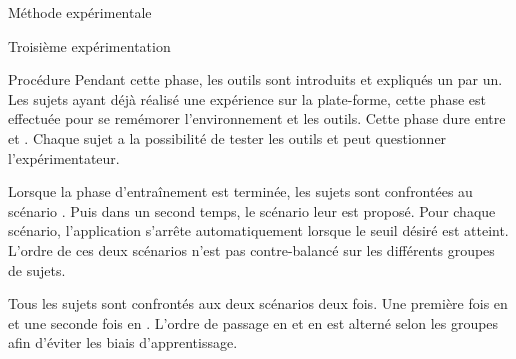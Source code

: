 \documentclass[myfrancais,ngerman,english,frenchb]{mythesis}
\begin{document}
\begin{mychapter}{Méthode expérimentale}
\begin{mysection}{Troisième expérimentation}
\begin{mysubsection}{Procédure}
				Pendant cette phase, les outils sont introduits et expliqués un par un.
				Les sujets ayant déjà réalisé une expérience sur la plate-forme, cette phase est effectuée pour se remémorer l'environnement et les outils.
				Cette phase dure entre  et .
				Chaque sujet a la possibilité de tester les outils et peut questionner l'expérimentateur.

				Lorsque la phase d'entraînement est terminée, les sujets sont confrontées au scénario .
				Puis dans un second temps, le scénario  leur est proposé.
				Pour chaque scénario, l'application s'arrête automatiquement lorsque le seuil   désiré est atteint.
				L'ordre de ces deux scénarios n'est pas contre-balancé sur les différents groupes de sujets.

				Tous les sujets sont confrontés aux deux scénarios deux fois.
				Une première fois en  et une seconde fois en .
				L'ordre de passage en  et en  est alterné selon les groupes afin d'éviter les biais d'apprentissage.


\end{mysubsection}
\end{mysection}
\end{mychapter}
\end{document}
